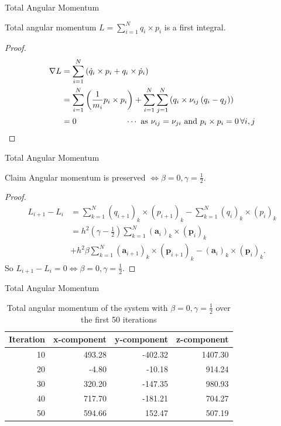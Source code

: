 \documentclass{beamer}
\renewcommand{\vec}[1]{\mathbf{#1}}
\begin{document}
\begin{frame}{Total Angular Momentum}
\begin{theorem} Total angular momentum $L = \sum_{i=1}^{N} q_{i} \times p_{i}$ is a first integral. \end{theorem}
\begin{proof}
	\begin{align*}
		\nabla L & = \sum_{i=1}^{N} \left(\dot{q}_{i} \times p_{i} + {q}_{i} \times \dot{p}_{i}\right) \\  
		& = \sum_{i=1}^{N} \left( \frac{1}{m_{i}}p_{i} \times p_{i}\right) +  \sum_{i=1}^{N}\sum_{j=1}^{N} \left(q_{i} \times \nu_{ij}\left(q_{i} - q_{j}\right)\right) \\
		& = 0  \qquad \qquad \qquad \cdots \mbox{ as }\nu_{ij} = \nu_{ji} \mbox{ and } p_{i} \times p_{i} = 0 \,\forall i, j \qedhere
	\end{align*}
\end{proof}
\end{frame}

\begin{frame}{Total Angular Momentum}
\begin{block}{Claim} Angular momentum is preserved $\Leftrightarrow \beta = 0, \gamma = \frac{1}{2}$. \end{block}
	\setlength{\belowdisplayskip}{1pt}
\begin{proof}
	\begin{align*}
		L_{i+1} -  L_{i} &= \sum_{k=1}^{N}\left(q_{i+1}\right)_{k} \times \left(p_{i+1}\right)_{k} - \sum_{k=1}^{N}\left(q_{i}\right)_{k} \times \left(p_{i}\right)_{k} \\
		&= h^{2}\left(\gamma - \frac{1}{2}\right)\sum_{k=1}^{N} (\vec{a}_{i})_{k} \times (\vec{p}_{i})_{k} \\ &+ h^{2}\beta\sum_{k=1}^{N} (\vec{a}_{i+1})_{k} \times (\vec{p}_{i+1})_{k} - (\vec{a}_{i})_{k} \times (\vec{p}_{i})_{k} .
	\end{align*}
	So $L_{i+1}-L_{i} = 0 \Leftrightarrow \beta = 0, \gamma = \frac{1}{2}$.
\end{proof}
\end{frame}

\begin{frame}{Total Angular Momentum}
\begin{table}
	\centering
	\begin{tabular}{ |r|r|r|r| }
		\hline
		Iteration & x-component & y-component & z-component\\
		\hline
		10 & 493.28 & -402.32 & 1407.30 \\
		20 & -4.80 & -10.18 & 914.24 \\
		30 & 320.20 & -147.35 & 980.93 \\
		40 & 717.70 & -181.21 & 704.27 \\
		50 & 594.66 & 152.47 & 507.19 \\
		\hline
	\end{tabular}
	\caption{Total angular momentum of the system with $\beta = 0, \gamma = \frac{1}{2}$ over the first 50 iterations}
	\label{tbl:total_angular_momentum_50_iterations}
\end{table}
\end{frame}
\end{document}
